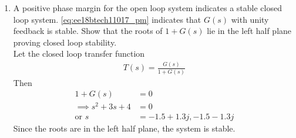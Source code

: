 \begin{enumerate}[label=\thesection.\arabic*.,ref=\thesection.\theenumi]
\item A positive phase margin for the open loop system indicates a stable closed loop system.  \eqref{eq:ee18btech11017_pm} indicates that $G(s)$ with unity feedback is stable.  Show that the roots of $1+G(s)$ lie in the left half plane proving closed loop stability.
\\
\solution  Let the closed loop transfer function
\begin{align}
T(s)=\frac{G(s)}{1+G(s)}
\end{align}
Then
\begin{align}
1+G(s)&=0 
\\
\implies s^{2}+3s+4&=0 
\\
\text{or } s&=-1.5+1.3j,-1.5-1.3j
\end{align}
Since the roots are in the left half plane, the system is stable.
%


\end{enumerate}

